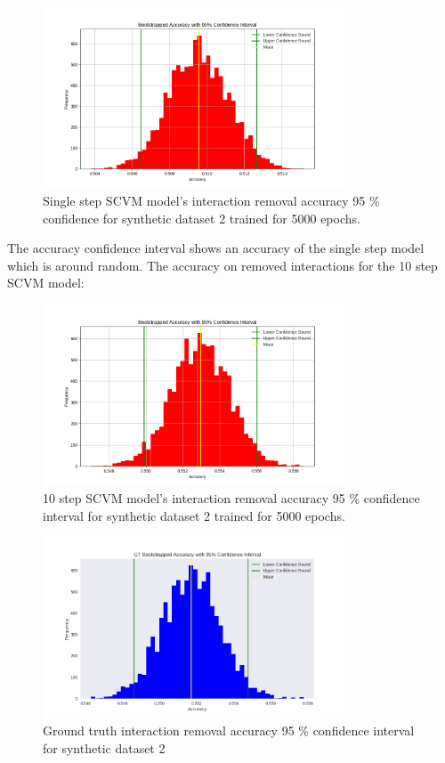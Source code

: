 \begin{figure}[H]
    \centering
    \centering
    \includegraphics[width=0.8\textwidth]{0_images/rq1_2_1step_accuracy_plot.png}
    \caption{Single step SCVM model's interaction removal accuracy 95 \% confidence for synthetic dataset 2 trained for 5000 epochs.}
    \label{fig:RQ1:1step_SCVM_accuracy}
\end{figure}
\noindent
The accuracy confidence interval shows an accuracy of the single step model which is around random. 
\clearpage
The accuracy on removed interactions for the 10 step SCVM model:
\begin{figure}[H]
    \centering
    \includegraphics[width=0.8\textwidth]{0_images/10step_SCVM_Accuracy_Plot.png}
    \caption{10 step SCVM model's interaction removal accuracy 95 \% confidence interval for synthetic dataset 2 trained for 5000 epochs.}
    \label{fig:RQ1:SCVM_accuracy}
\end{figure}
\begin{figure}[H]
    \centering
    \includegraphics[width=0.8\textwidth]{0_images/10step_SCVM_GT_Accuracy_Plot.png}
    \caption{Ground truth interaction removal accuracy 95 \% confidence interval for synthetic dataset 2}
\end{figure}
